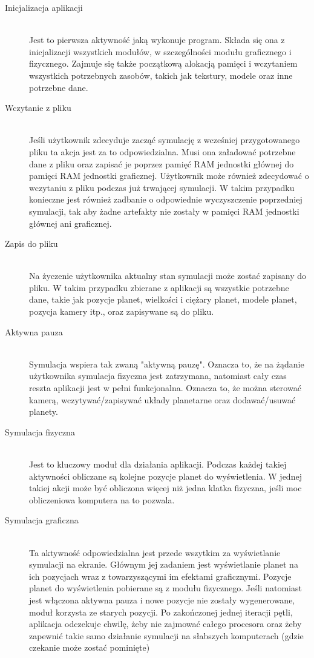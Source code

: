 \begin{description}
	\item[Inicjalizacja aplikacji] \hfill \\
	Jest to pierwsza aktywność jaką wykonuje program. Składa się ona z inicjalizacji wszystkich modułów, w szczególności modułu graficznego i fizycznego. Zajmuje się także początkową alokacją pamięci i wczytaniem wszystkich potrzebnych zasobów, takich jak tekstury, modele oraz inne potrzebne dane.
	\item[Wczytanie z pliku] \hfill \\
	Jeśli użytkownik zdecyduje zacząć symulację z wcześniej przygotowanego pliku ta akcja jest za to odpowiedzialna. Musi ona załadować potrzebne dane z pliku oraz zapisać je poprzez pamięć RAM jednostki głównej do pamięci RAM jednostki graficznej. Użytkownik może również zdecydować o wczytaniu z pliku podczas już trwającej symulacji. W takim przypadku konieczne jest również zadbanie o odpowiednie wyczyszczenie poprzedniej symulacji, tak aby żadne artefakty nie zostały w pamięci RAM jednostki głównej ani graficznej.
	\item[Zapis do pliku] \hfill \\
	Na życzenie użytkownika aktualny stan symulacji może zostać zapisany do pliku. W takim przypadku zbierane z aplikacji są wszystkie potrzebne dane, takie jak pozycje planet, wielkości i ciężary planet, modele planet, pozycja kamery itp., oraz zapisywane są do pliku.
	\item[Aktywna pauza] \hfill \\
	Symulacja wspiera tak zwaną "aktywną pauzę". Oznacza to, że na żądanie użytkownika symulacja fizyczna jest zatrzymana, natomiast cały czas reszta aplikacji jest w pełni funkcjonalna. Oznacza to, że można sterować kamerą, wczytywać/zapisywać układy planetarne oraz dodawać/usuwać planety.
	\item[Symulacja fizyczna] \hfill \\
	Jest to kluczowy moduł dla działania aplikacji. Podczas każdej takiej aktywności obliczane są kolejne pozycje planet do wyświetlenia. W jednej takiej akcji może być obliczona więcej niż jedna klatka fizyczna, jeśli moc obliczeniowa komputera na to pozwala.
	\item[Symulacja graficzna] \hfill \\
	Ta aktywność odpowiedzialna jest przede wszytkim za wyświetlanie symulacji na ekranie. Głównym jej zadaniem jest wyświetlanie planet na ich pozycjach wraz z towarzyszącymi im efektami graficznymi. Pozycje planet do wyświetlenia pobierane są z modułu fizycznego. Jeśli natomiast jest włączona aktywna pauza i nowe pozycje nie zostały wygenerowane, moduł korzysta ze starych pozycji. Po zakończonej jednej iteracji pętli, aplikacja odczekuje chwilę, żeby nie zajmować całego procesora oraz żeby zapewnić takie samo działanie symulacji na słabszych komputerach (gdzie czekanie może zostać pominięte)
\end{description}

